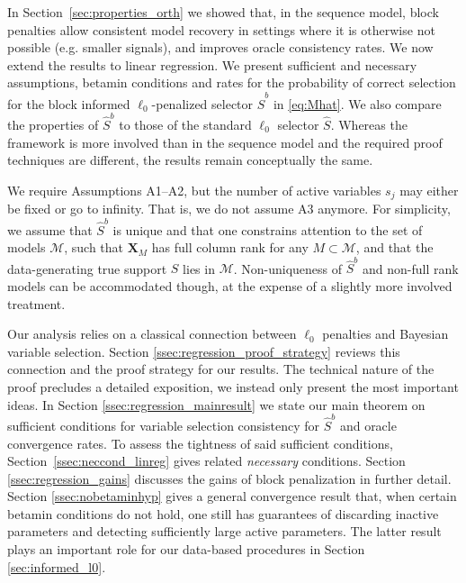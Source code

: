 \documentclass[aos]{imsart}
\theoremstyle{plain}
\newcommand{\paul}[1]{{\small{\color{green} \sf $\spadesuit$ Paul: #1}}}
\newcommand{\M}{\mathcal{M}}
\newcommand{\bs}{\boldsymbol}
\begin{document}
In Section~\ref{sec:properties_orth} we showed that, in the sequence model, block penalties allow consistent model recovery in settings where it is otherwise not possible (e.g. smaller signals), and improves oracle consistency rates. We now extend the results to linear regression. 
We present sufficient and necessary assumptions, 
betamin conditions and rates for the probability of correct selection for the block informed $\ell_0$-penalized selector $\hat S^b$ in \eqref{eq:Mhat}. We also compare the properties of $\hat S^b$ to those of the standard $\ell_0$ selector $\hat S$. 
Whereas the framework is more involved than in the sequence model and the required proof techniques are different, the results remain conceptually the same. 

We require Assumptions A1--A2, but the number of active variables $s_j$ may either be fixed or go to infinity. 
That is, we do not assume A3 anymore. For simplicity, we assume that $\hat{S}^b$ is unique and that one constrains attention to the set of models $\M$,
such that
$\bs X_M$ has full column rank for any $M \subset \M$, and that the data-generating true support $S$ lies in $\M$. Non-uniqueness of $\hat{S}^b$ and non-full rank models can be accommodated though, at the expense of a slightly more involved treatment.

Our analysis relies on a classical connection
between $\ell_0$ penalties and Bayesian variable selection. 
Section \ref{ssec:regression_proof_strategy} reviews this connection and the proof strategy for our results.
The technical nature of the proof precludes a detailed exposition, we instead only present the most important ideas.
In Section \ref{ssec:regression_mainresult} we state our main theorem
on sufficient conditions for variable selection consistency for $\hat{S}^{b}$ and oracle convergence rates. %
To assess the tightness of said sufficient conditions,  Section~\ref{ssec:neccond_linreg} gives related {\it necessary} conditions. %
Section \ref{ssec:regression_gains} discusses the gains of block penalization in further detail. Section \ref{ssec:nobetaminhyp} gives a general convergence result that, when certain betamin conditions do not hold, one still has guarantees of discarding inactive parameters and detecting sufficiently large active parameters.
The latter result plays an important role for our data-based procedures in Section \ref{sec:informed_l0}. \color{black}
\end{document}
